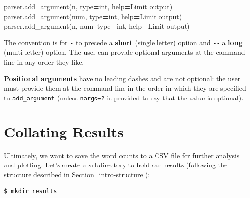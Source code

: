 \documentclass[
]{krantz}
\makeatletter
\newenvironment{Shaded}{\begin{snugshade}}{\end{snugshade}}
\newcommand{\BuiltInTok}[1]{#1}
\newcommand{\NormalTok}[1]{#1}
\newcommand{\OperatorTok}[1]{\textcolor[rgb]{0.81,0.36,0.00}{\textbf{#1}}}
\newcommand{\StringTok}[1]{\textcolor[rgb]{0.31,0.60,0.02}{#1}}
\newenvironment{kframe}{%
\medskip{}
\setlength{\fboxsep}{.8em}
 \def\at@end@of@kframe{}%
 \ifinner\ifhmode%
  \def\at@end@of@kframe{\end{minipage}}%
  \begin{minipage}{\columnwidth}%
 \fi\fi%
 \def\FrameCommand##1{\hskip\@totalleftmargin \hskip-\fboxsep
 \colorbox{shadecolor}{##1}\hskip-\fboxsep
     \hskip-\linewidth \hskip-\@totalleftmargin \hskip\columnwidth}%
 \MakeFramed {\advance\hsize-\width
   \@totalleftmargin\z@ \linewidth\hsize
   \@setminipage}}%
 {\par\unskip\endMakeFramed%
 \at@end@of@kframe}
\renewenvironment{Shaded}{\begin{kframe}}{\end{kframe}}
\newcommand{\gref}[2]{\hyperlink{#2}{\textbf{#1}}}
\makeatother
\begin{document}
\begin{Shaded}
\begin{Highlighting}[]
\NormalTok{parser.add\_argument(}\StringTok{\textquotesingle{}{-}n\textquotesingle{}}\NormalTok{, }\BuiltInTok{type}\OperatorTok{=}\BuiltInTok{int}\NormalTok{, }\BuiltInTok{help}\OperatorTok{=}\StringTok{\textquotesingle{}Limit output\textquotesingle{}}\NormalTok{)}
\NormalTok{parser.add\_argument(}\StringTok{\textquotesingle{}{-}{-}num\textquotesingle{}}\NormalTok{, }\BuiltInTok{type}\OperatorTok{=}\BuiltInTok{int}\NormalTok{, }\BuiltInTok{help}\OperatorTok{=}\StringTok{\textquotesingle{}Limit output\textquotesingle{}}\NormalTok{)}
\NormalTok{parser.add\_argument(}\StringTok{\textquotesingle{}{-}n\textquotesingle{}}\NormalTok{, }\StringTok{\textquotesingle{}{-}{-}num\textquotesingle{}}\NormalTok{, }\BuiltInTok{type}\OperatorTok{=}\BuiltInTok{int}\NormalTok{, }\BuiltInTok{help}\OperatorTok{=}\StringTok{\textquotesingle{}Limit output\textquotesingle{}}\NormalTok{)}
\end{Highlighting}
\end{Shaded}

The convention is for \texttt{-} to precede
a \gref{short}{short\_option} (single letter) option
and \texttt{-\/-} a \gref{long}{long\_option} (multi-letter) option.
The user can provide optional arguments at the command line in any order they like.

\gref{Positional arguments}{positional\_argument}
have no leading dashes and are not optional:
the user must provide them at the command line
in the order in which they are specified to \texttt{add\_argument}
(unless \texttt{nargs=\textquotesingle{}?\textquotesingle{}} is provided to say that the value is optional).

\hypertarget{scripting-collate}{%
\section{Collating Results}\label{scripting-collate}}

Ultimately,
we want to save the word counts to a CSV file for further analysis and plotting.
Let's create a subdirectory to hold our results
(following the structure described in Section~\ref{intro-structure}):

\begin{verbatim}
$ mkdir results
\end{verbatim}
\end{document}
